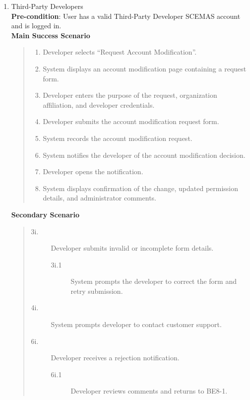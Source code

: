 \documentclass[]{article}
\begin{document}
\begin{enumerate}[{\bf BE8.}]
\begin{enumerate}[{\bf VP1.}]
			\item Third-Party Developers \\
                \textbf{Pre-condition}: User has a valid Third-Party Developer SCEMAS account and is logged in. \\
                \textbf{Main Success Scenario}
                \begin{quote}
                    \begin{enumerate}[1.]
                        \item Developer selects ``Request Account Modification''.
                        \item System displays an account modification page containing a request form.
                        \item Developer enters the purpose of the request, organization affiliation, and developer credentials.
                        \item Developer submits the account modification request form.
                        \item System records the account modification request.
                        \item System notifies the developer of the account modification decision.
                        \item Developer opens the notification.
                        \item System displays confirmation of the change, updated permission details, and administrator comments.
                    \end{enumerate}
                \end{quote}
                \textbf{Secondary Scenario}
                \begin{quote}
                    \begin{description}
                        \item[\textmd{3i.}] Developer submits invalid or incomplete form details.
                        \begin{description}
                            \item[\textmd{3i.1}] System prompts the developer to correct the form and retry submission.
                        \end{description}
                        \item[\textmd{4i.}] System prompts developer to contact customer support.
                        \item[\textmd{6i.}] Developer receives a rejection notification.
                        \begin{description}
                            \item[\textmd{6i.1}] Developer reviews comments and returns to BE8-1.
                        \end{description}
                    \end{description}
                \end{quote}


\end{enumerate}
\end{enumerate}
\end{document}

